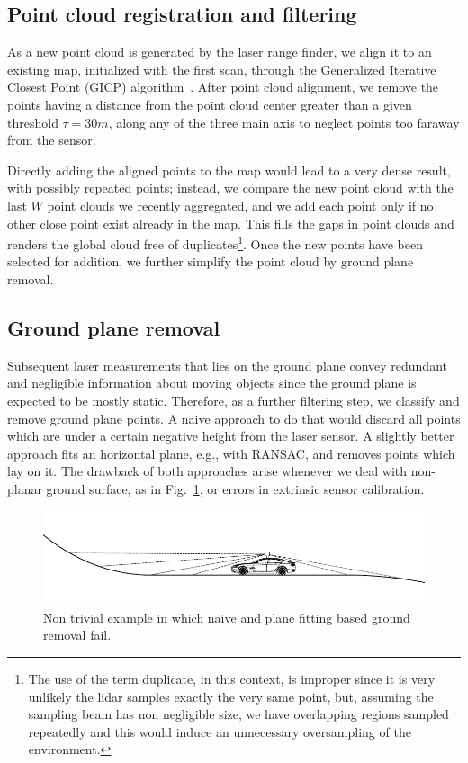 \subsection{Point cloud registration and filtering}
As a new point cloud is generated by the laser range finder, we align it to an existing map, initialized with the first scan, through the Generalized Iterative Closest Point (GICP) algorithm~\cite{segal2009generalized}.
%
After point cloud alignment, we remove the points having a distance from the point cloud center greater than a given threshold $\tau = 30m$, along any of the three main axis to neglect points too faraway from the sensor.

Directly adding the aligned points to the map would lead to a very dense result, with possibly repeated points; instead, we compare the new point cloud with the last $W$ point clouds we recently aggregated, and we add each point only if no other close point exist already in the map. This fills the gaps in point clouds and renders the global cloud free of duplicates\footnote{The use of the term duplicate, in this context, is improper since it is very unlikely the lidar samples exactly the very same point, but, assuming the sampling beam has non negligible size, we have overlapping regions sampled repeatedly and this would induce an unnecessary oversampling of the environment.}. Once the new points have been selected for addition, we further simplify the point cloud by ground plane removal.

\subsection{Ground plane removal}
Subsequent laser measurements that lies on the ground plane convey redundant and negligible information about moving objects since the ground plane is expected to be mostly static. Therefore, as a further filtering step, we classify and remove ground plane points. 
A naive approach to do that would discard all points which are under a certain negative height from the laser sensor. 
A slightly better approach fits an horizontal plane, e.g., with RANSAC, and removes points which lay on it.
The drawback of both approaches arise whenever we deal with non-planar ground surface, as in Fig.~\ref{fig:nonplane}, or errors in extrinsic sensor calibration.

\begin{figure}
\includegraphics[width=\columnwidth]{./img/ch-laser/./non-plane}
\caption{Non trivial example in which naive and plane fitting based ground removal fail.}
\label{fig:nonplane}
\end{figure}

